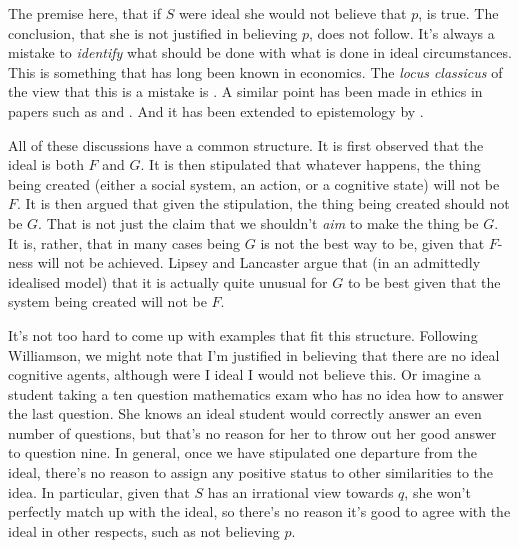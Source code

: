 {The premise here, that if \(S\) were ideal she would not believe that \(p\), is true. The conclusion, that she is not justified in believing \(p\), does not follow. It's always a mistake to \textit{identify} what should be done with what is done in ideal circumstances. This is something that has long been known in economics. The \textit{locus classicus} of the view that this is a mistake is \citet{LipseyLancaster}. A similar point has been made in ethics in papers such as \citet{Watson1977} and \citet{KennettSmith1996b, KennettSmith1996a}. And it has been extended to epistemology by \citet{Williamson1998-WILCOK}.

All of these discussions have a common structure. It is first observed that the ideal is both \(F\) and \(G\). It is then stipulated that whatever happens, the thing being created (either a social system, an action, or a cognitive state) will not be \(F\). It is then argued that given the stipulation, the thing being created should not be \(G\). That is not just the claim that we shouldn't \textit{aim} to make the thing be \(G\). It is, rather, that in many cases being \(G\) is not the best way to be, given that \(F\)-ness will not be achieved. Lipsey and Lancaster argue that (in an admittedly idealised model) that it is actually quite unusual for \(G\) to be best given that the system being created will not be \(F\).

It's not too hard to come up with examples that fit this structure. Following Williamson, we might note that I'm justified in believing that there are no ideal cognitive agents, although were I ideal I would not believe this. Or imagine a student taking a ten question mathematics exam who has no idea how to answer the last question. She knows an ideal student would correctly answer an even number of questions, but that's no reason for her to throw out her good answer to question nine. In general, once we have stipulated one departure from the ideal, there's no reason to assign any positive status to other similarities to the idea. In particular, given that \(S\) has an irrational view towards \(q\), she won't perfectly match up with the ideal, so there's no reason it's good to agree with the ideal in other respects, such as not believing \(p\).

}
